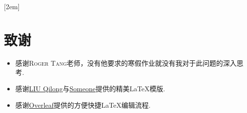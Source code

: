 
[2em]{\vspace{.5\baselineskip}\xiaosan\song}
             {\prechaptername\CJKnumber{\thecontentslabel}\postchaptername\qquad}{} 
             {}                            %
\lhead{}
\rhead{}
\lfoot{}
\cfoot{}
\rfoot{}
\chapter*{致\quad 谢}
\setcounter{page}{1}

\begin{itemize}
	\item 感谢\textsc{Roger Tang}老师，没有他要求的寒假作业就没有我对于此问题的深入思考.
	\item 感谢\href{https://www.overleaf.com/latex/templates/xi-nan-da-xue-swu-beamer-zhu-ti/bgprxfbyhqsb}{LIU Qilong}与\href{https://www.overleaf.com/latex/templates/tian-jin-da-xue-tianjin-university-tju-2022ben-ke-sheng-bi-ye-lun-wen/rrfbkrpsrdkh}{Someone}提供的精美\LaTeX 模版.
	\item 感谢\href{https://www.overleaf.com/}{Overleaf}提供的方便快捷\LaTeX 编辑流程.
\end{itemize}
